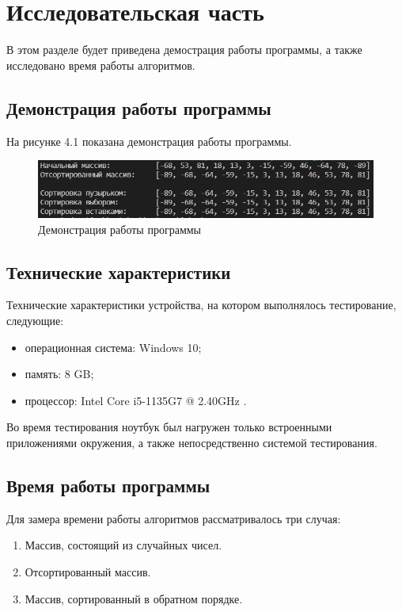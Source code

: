 \chapter{Исследовательская часть}
В этом разделе будет приведена демострация работы программы, 
а также исследовано время работы алгоритмов.

\section{Демонстрация работы программы}
На рисунке 4.1 показана демонстрация работы программы.

\begin{figure}[hp]
	\begin{center}
		\includegraphics[width=\linewidth]{inc/work.png}
	\end{center}
	\caption{Демонстрация работы программы}
\end{figure}

\section{Технические характеристики}
Технические характеристики устройства, на котором выполнялось тестирование, следующие:
\begin{itemize}
	\item операционная система: Windows 10;
	\item память: 8 GB;
	\item процессор: Intel Core i5-1135G7 @ 2.40GHz \cite{intel}.
\end{itemize}

Во время тестирования ноутбук был нагружен только встроенными приложениями окружения, а также непосредственно системой тестирования.


\section{Время работы программы}
Для замера времени работы алгоритмов рассматривалось три случая:
\begin{enumerate}
	\item Массив, состоящий из случайных чисел.
	\item Отсортированный массив.
	\item Массив, сортированный в обратном порядке.
\end{enumerate}

